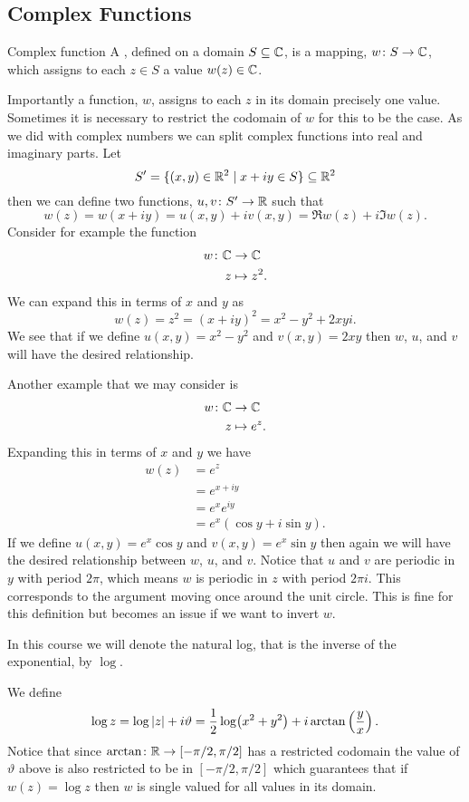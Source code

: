 \documentclass{article}
\newcommand{\st}{\mid}
\begin{document}
    \subsection{Complex Functions}
    \begin{definition}{Complex function}{}
        A , defined on a domain \(S \subseteq\mathbb{C}\), is a mapping, \(w\colon S\to\mathbb{C}\), which assigns to each \(z\in S\) a value \(w(z)\in\mathbb{C}\).
    \end{definition}
    Importantly a function, \(w\), assigns to each \(z\) in its domain precisely one value.
    Sometimes it is necessary to restrict the codomain of \(w\) for this to be the case.
    As we did with complex numbers we can split complex functions into real and imaginary parts.
    Let
    \[S' = \{(x, y)\in\reals^2\st x + iy \in S\} \subseteq\reals^2\]
    then we can define two functions, \(u, v\colon S'\to\mathbb{R}\) such that
    \[w(z) = w(x + iy) = u(x, y) + iv(x, y) = \Re w(z) + i\Im w(z).\]
    Consider for example the function
    \begin{align*}
        w\colon\mathbb{C}&\to\mathbb{C}\\
        z&\mapsto z^2.
    \end{align*}
    We can expand this in terms of \(x\) and \(y\) as
    \[w(z) = z^2 = (x + iy)^2 = x^2 - y^2 + 2xyi.\]
    We see that if we define \(u(x, y) = x^2 - y^2\) and \(v(x, y) = 2xy\) then \(w\), \(u\), and \(v\) will have the desired relationship.
    
    Another example that we may consider is
    \begin{align*}
        w\colon\mathbb{C}&\to\mathbb{C}\\
        z&\mapsto e^z.
    \end{align*}
    Expanding this in terms of \(x\) and \(y\) we have
    \begin{align*}
        w(z) &= e^z\\
        &= e^{x + iy}\\
        &= e^xe^{iy}\\
        &= e^x(\cos y + i\sin y).
    \end{align*}
    If we define \(u(x, y) = e^x\cos y\) and \(v(x, y) = e^x\sin y\) then again we will have the desired relationship between \(w\), \(u\), and \(v\).
    Notice that \(u\) and \(v\) are periodic in \(y\) with period \(2\pi\), which means \(w\) is periodic in \(z\) with period \(2\pi i\).
    This corresponds to the argument moving once around the unit circle.
    This is fine for this definition but becomes an issue if we want to invert \(w\).
    \begin{notation*}{}
        In this course we will denote the natural log, that is the inverse of the exponential, by \(\log\).
    \end{notation*}
    We define
    \[\log z = \log \abs{z} + i\vartheta = \frac{1}{2}\log(x^2 + y^2) + i\arctan\left(\frac{y}{x}\right).\]
    Notice that since \(\arctan\colon\mathbb{R}\to [-\pi/2, \pi/2]\) has a restricted codomain the value of \(\vartheta\) above is also restricted to be in \([-\pi/2, \pi/2]\) which guarantees that if \(w(z) = \log z\) then \(w\) is single valued for all values in its domain.
    
\end{document}

